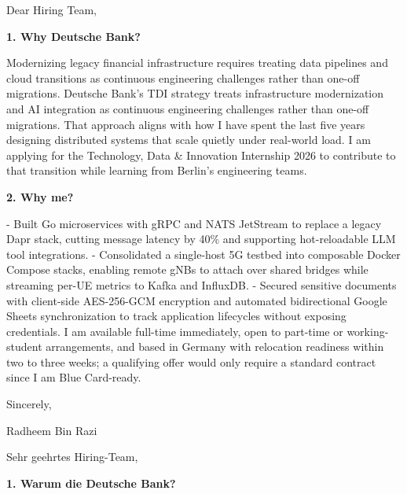 \documentclass[11pt,a4paper]{coverletter}
\begin{document}

\opening{Dear Hiring Team,}

\vspace{8pt}\noindent\textbf{1. Why Deutsche Bank?}\par\vspace{3pt}

Modernizing legacy financial infrastructure requires treating data pipelines and cloud transitions as continuous engineering challenges rather than one-off migrations. Deutsche Bank’s TDI strategy treats infrastructure modernization and AI integration as continuous engineering challenges rather than one-off migrations. That approach aligns with how I have spent the last five years designing distributed systems that scale quietly under real-world load. I am applying for the Technology, Data \& Innovation Internship 2026 to contribute to that transition while learning from Berlin’s engineering teams.

\vspace{8pt}\noindent\textbf{2. Why me?}\par\vspace{3pt}

- Built Go microservices with gRPC and NATS JetStream to replace a legacy Dapr stack, cutting message latency by 40\% and supporting hot-reloadable LLM tool integrations. - Consolidated a single-host 5G testbed into composable Docker Compose stacks, enabling remote gNBs to attach over shared bridges while streaming per-UE metrics to Kafka and InfluxDB. - Secured sensitive documents with client-side AES-256-GCM encryption and automated bidirectional Google Sheets synchronization to track application lifecycles without exposing credentials. I am available full-time immediately, open to part-time or working-student arrangements, and based in Germany with relocation readiness within two to three weeks; a qualifying offer would only require a standard contract since I am Blue Card-ready.

\closing{Sincerely,}{Radheem Bin Razi}

\clearpage
{}


\opening{Sehr geehrtes Hiring-Team,}

\vspace{8pt}\noindent\textbf{1. Warum die Deutsche Bank?}\par\vspace{3pt}
\end{document}
